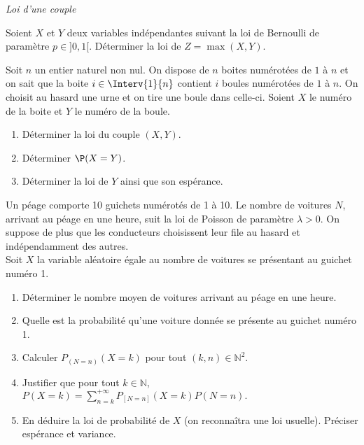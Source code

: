 \documentclass[a4paper,10pt]{report}
\begin{document}
\begin{center}
\textit{{ {\large Loi d'une couple}}}
\end{center}

\medskip

\begin{Exercice}{} Soient $X$ et $Y$ deux variables indépendantes suivant la loi de Bernoulli de paramètre $p \in ]0,1[$. Déterminer la loi de $Z= \max(X,Y)$.
\end{Exercice}

\begin{Exercice}{} Soit $n$ un entier naturel non nul. On dispose de $n$ boites numérotées de $1$ à $n$ et on sait que la boite $i \in \Interv{1}{n}$ contient $i$ boules numérotées de $1$ à $n$. On choisit au hasard une urne et on tire une boule dans celle-ci. Soient $X$ le numéro de la boite et $Y$ le numéro de la boule. 

\begin{enumerate}
\item Déterminer la loi du couple $(X,Y)$.
\item Déterminer $\P(X=Y)$.
\item Déterminer la loi de $Y$ ainsi que son espérance.
\end{enumerate}
\end{Exercice}

\begin{Exercice}{} Un péage comporte 10 guichets numérotés de 1 à 10. Le nombre de voitures $N$, arrivant au péage en une heure, suit la loi de Poisson de paramètre $\lambda>0$. On suppose de plus que les conducteurs choisissent leur file au hasard et indépendamment des autres.\\
Soit $X$ la variable aléatoire égale au nombre de voitures se présentant au guichet numéro 1.
\begin{enumerate}
\item Déterminer le nombre moyen de voitures arrivant au péage en une heure.
\item Quelle est la probabilité qu'une voiture donnée se présente au guichet numéro 1.
\item Calculer $P_{(N=n)}(X=k)$ pour tout $(k,n) \in \mathbb{N}^2$.
\item Justifier que pour tout $k \in \mathbb{N}$, $\displaystyle{P(X=k)=\sum_{n=k}^{+\infty}P_{[N=n]}(X=k) P(N=n).}$
\item En déduire la loi de probabilité de $X$ (on reconnaîtra une loi usuelle). Préciser espérance et variance.
\end{enumerate}
\end{Exercice}
\end{document}
